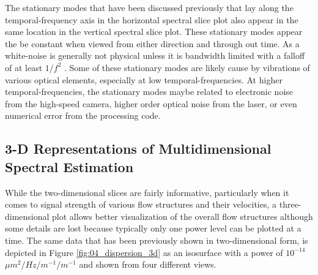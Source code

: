 The stationary modes that have been discussed previously that lay along the temporal-frequency axis in the horizontal spectral slice plot also appear in the same location in the vertical spectral slice plot.
These stationary modes appear the be constant when viewed from either direction and through out time.
As a white-noise is generally not physical unless it is bandwidth limited with a falloff of at least $1/f^2$ \cite{Blackman-1958-4QtKgDb8}.
Some of these stationary modes are likely cause by vibrations of various optical elements, especially at low temporal-frequencies.
At higher temporal-frequencies, the stationary modes maybe related to electronic noise from the high-speed camera, higher order optical noise from the laser, or even numerical error from the processing code.

\subsection{3-D Representations of Multidimensional Spectral Estimation}
While the two-dimensional slices are fairly informative, particularly when it comes to signal strength of various flow structures and their velocities, a three-dimensional plot allows better visualization of the overall flow structures although some details are lost because typically only one power level can be plotted at a time.
The same data that has been previously shown in two-dimensional form, is depicted in Figure \ref{fig:04_dispersion_3d} as an isosurface with a power of $10^{-14}$ $\mu m^2/Hz/m^{-1}/m^{-1}$ and shown from four different views.
